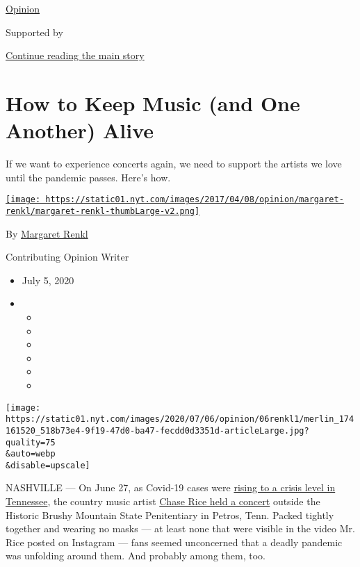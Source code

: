 \href{/section/opinion}{Opinion}

Supported by

\protect\hyperlink{after-sponsor}{Continue reading the main story}

\hypertarget{how-to-keep-music-and-one-another-alive}{%
\section{How to Keep Music (and One Another)
Alive}\label{how-to-keep-music-and-one-another-alive}}

If we want to experience concerts again, we need to support the artists
we love until the pandemic passes. Here's how.

\href{https://www.nytimes.com/by/margaret-renkl}{\texttt{[image: https://static01.nyt.com/images/2017/04/08/opinion/margaret-renkl/margaret-renkl-thumbLarge-v2.png]}}

By \href{https://www.nytimes.com/by/margaret-renkl}{Margaret Renkl}

Contributing Opinion Writer

\begin{itemize}
\item
  July 5, 2020
\item
  \begin{itemize}
  \item
  \item
  \item
  \item
  \item
  \item
  \end{itemize}
\end{itemize}

\texttt{[image: https://static01.nyt.com/images/2020/07/06/opinion/06renkl1/merlin\_174161520\_518b73e4-9f19-47d0-ba47-fecdd0d3351d-articleLarge.jpg?quality=75\\\&auto=webp\\\&disable=upscale]}

NASHVILLE --- On June 27, as Covid-19 cases were
\href{https://wpln.org/post/following-high-case-counts-tennessees-pandemic-tracking-site-goes-down/?mc_cid=a2c6e0f2a3\&mc_eid=e952ad88f8}{rising
to a crisis level in Tennessee}, the country music artist
\href{https://www.tennessean.com/story/entertainment/music/2020/06/29/chase-rice-chris-janson-concerts-roil-nashvilles-ravaged-music-industry/3280563001/}{Chase
Rice held a concert} outside the Historic Brushy Mountain State
Penitentiary in Petros, Tenn. Packed tightly together and wearing no
masks --- at least none that were visible in the video Mr. Rice posted
on Instagram --- fans seemed unconcerned that a deadly pandemic was
unfolding around them. And probably among them, too.

